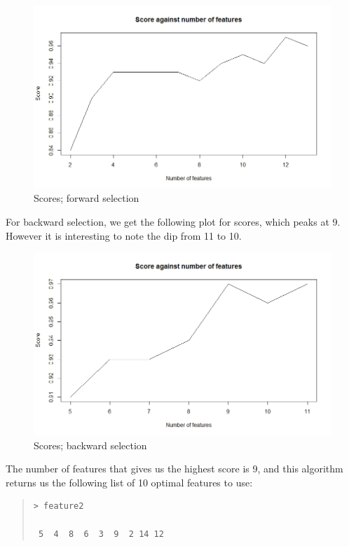 \documentclass[11pt, a4paper]{article}
\begin{document}
\begin{figure}[H]
\centering
	\includegraphics[scale=0.4]{jscore.jpeg}
\caption{Scores; forward selection}
\end{figure}

For backward selection, we get the following plot for scores, which peaks at 9. However it is interesting to note the dip from 11 to 10.

\begin{figure}[H]
\centering
	\includegraphics[scale=0.4]{jscore2.jpeg}
\caption{Scores; backward selection}
\end{figure}

The number of features that gives us the highest score is 9, and this algorithm returns us the following list of 10 optimal features to use:

\begin{quote}
\begin{verbatim}
> feature2
                           
 5  4  8  6  3  9  2 14 12   
\end{verbatim}
\end{quote}
\end{document}
